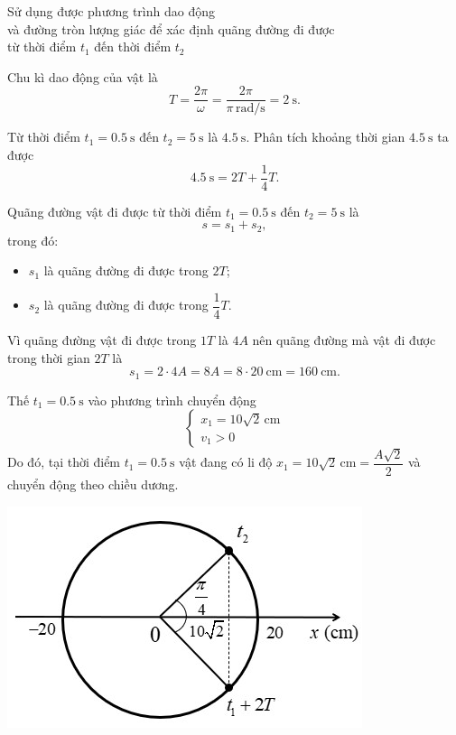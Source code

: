 \begin{dang}{Sử dụng được phương trình dao động\\ và đường tròn lượng giác để xác định quãng đường đi được\\ từ thời điểm $t_1$ đến thời điểm $t_2$}
{		Chu kì dao động của vật là
		\begin{equation*}
			T=\dfrac{2\pi}{\omega}=\dfrac{2\pi}{\pi\,\text{rad/s}}=\SI{2}{\second}.
		\end{equation*}
		
		Từ thời điểm $t_1=\SI{0,5}{\second}$ đến $t_2=\SI{5}{\second}$ là $\SI{4,5}{\second}$. Phân tích khoảng thời gian $\SI{4,5}{\second}$ ta được
		\begin{equation*}
			\SI{4,5}{\second}=2T+\dfrac{1}{4}T.
		\end{equation*}
		
		Quãng đường vật đi được từ thời điểm $t_1=\SI{0,5}{\second}$ đến $t_2=\SI{5}{\second}$ là
		\begin{equation*}
			s=s_1+s_2,
		\end{equation*}
		trong đó:
		\begin{itemize}
			\item $s_1$ là quãng đường đi được trong $2T$;
			\item $s_2$ là quãng đường đi được trong $\dfrac{1}{4}T$.
		\end{itemize}
		
		Vì quãng đường vật đi được trong $1T$ là $4A$ nên quãng đường mà vật đi được trong thời gian $2T$ là
		\begin{equation*}
			s_1=2\cdot4A=8A=8\cdot\SI{20}{\centi\meter}=\SI{160}{\centi\meter}.
		\end{equation*}
		
		Thế $t_1=\SI{0,5}{\second}$ vào phương trình chuyển động
		\begin{equation*}
			\begin{cases}
				x_1=10\sqrt{2}\,\text{cm} \\
				v_1>0
			\end{cases}
		\end{equation*}
		Do đó, tại thời điểm $t_1=\SI{0,5}{\second}$ vật đang có li độ $x_1=10\sqrt{2}\,\text{cm}=\dfrac{A\sqrt{2}}{2}$ và chuyển động theo chiều dương.
		
		\begin{center}
			\includegraphics[scale=0.9]{../figs/VN12-PH-02-A-001-6-V2-1.jpg}
		\end{center}
		
}
\end{dang}
